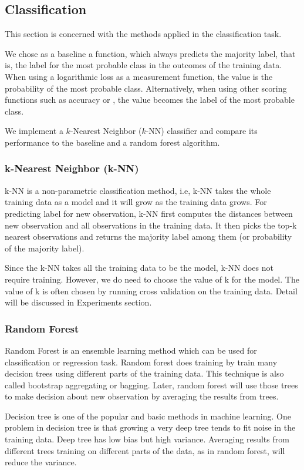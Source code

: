 \subsection{Classification}

This section is concerned with the methods applied in the classification task.

We chose as a baseline a function, which always predicts the majority label,
that is, the label for the most probable class in the outcomes of the training
data.  When using a logarithmic loss as a measurement function, the value is the
probability of the most probable class.  Alternatively, when using other scoring
functions such as accuracy or \fmeasure, the value becomes the label of the most
probable class.

We implement a $k$-Nearest Neighbor ($k$-NN) classifier and compare its
performance to the baseline and a random forest algorithm.

\subsubsection{k-Nearest Neighbor (k-NN)}
k-NN is a non-parametric classification method, i.e, k-NN takes the whole training data as a model and it will grow as the training data grows. For predicting label for new observation, k-NN first computes the distances between new observation and all observations in the training data. It then picks the top-k nearest observations and returns the majority label among them (or probability of the majority label).

Since the k-NN takes all the training data to be the model, k-NN does not require training. However, we do need to choose the value of k for the model. The value of k is often chosen by running cross validation on the training data. Detail will be discussed in Experiments section.

\subsubsection{Random Forest}
Random Forest is an ensemble learning method which can be used for classification or regression task. Random forest does training by train many decision trees using different parts of the training data. This technique is also called bootstrap aggregating or bagging. Later, random forest will use those trees to make decision about new observation by averaging the results from trees.

Decision tree is one of the popular and basic methods in machine learning. One problem in decision tree is that growing a very deep tree tends to fit noise in the training data. Deep tree has low bias but high variance. Averaging results from different trees training on different parts of the data, as in random forest, will reduce the variance.

